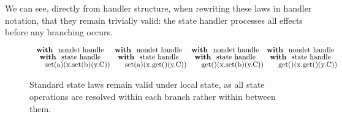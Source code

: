 \documentclass[logo,bsc,singlespacing,parskip]{infthesis}
\begin{document}
We can see, directly from handler structure, when rewriting these laws in handler notation, that they remain trivially valid: the state handler processes all effects before any branching occurs.
\begin{figure}[H]

\centering

\vspace{-0.0em}
\[
\begin{array}{@{}l@{}l@{}l@{}l@{}}
\shortstack{
  \textbf{with } \text{nondet handle} \\
  \textbf{with } \text{state handle} \\
  \quad\quad\text{set(a)(x.set(b)(y.C))}
}
&
\shortstack{
  \textbf{with } \text{nondet handle} \\
  \textbf{with } \text{state handle} \\
  \quad\quad\text{set(a)(x.get()(y.C))}
}
&
\shortstack{
  \textbf{with } \text{nondet handle} \\
  \textbf{with } \text{state handle} \\
  \quad\quad\text{get()(x.set(b)(y.C))}
}
&
\shortstack{
  \textbf{with } \text{nondet handle} \\
  \textbf{with } \text{state handle} \\
  \quad\quad\text{get()(x.get()(y.C))}
}
\end{array}
\]
\caption{Standard state laws remain valid under local state, as all state operations are resolved within each branch rather within between them.}
\label{fig:local-state-laws}
\end{figure}
\end{document}
